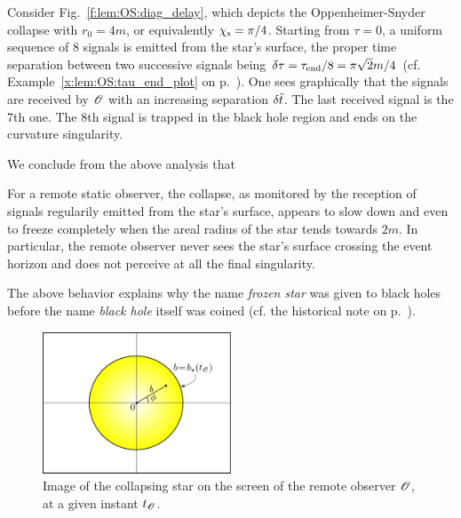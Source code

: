 \begin{example}
Consider Fig.~\ref{f:lem:OS:diag_delay}, which depicts the Oppenheimer-Snyder collapse
with $r_0 = 4 m$, or equivalently $\chi_{\rm s} = \pi/4$. Starting from $\tau=0$, a uniform sequence of 8 signals is emitted from the star's surface, the proper time separation between two successive signals being
$\delta\tau = \tau_{\rm end}/8 = \pi\sqrt{2} m / 4$ (cf. Example~\ref{x:lem:OS:tau_end_plot} on
p.~\pageref{x:lem:OS:tau_end_plot}). One sees graphically that the signals are received by $\mathscr{O}$
with an increasing separation $\delta{\tilde t}$. The last received signal is the 7th one. The 8th signal is trapped in the black hole region and ends on the curvature singularity.
\end{example}

We conclude from the above analysis that
\begin{greybox}
For a remote static observer, the collapse, as monitored by the reception of signals regularily emitted from the star's surface,
appears to slow down and even to freeze completely when the areal radius
of the star tends towards $2 m$. In particular, the remote observer never sees the
star's surface crossing the event horizon and does not perceive at all the final singularity.
\end{greybox}

\begin{hist}
The above behavior explains why the name \emph{frozen star}
was given to black holes before the name \emph{black hole} itself was coined
(cf. the historical note on p.~\pageref{h:glo:black_hole_name}).
\end{hist}


\begin{figure}
\centerline{
\includegraphics[width=0.5\textwidth]{lem_image.pdf}
}
\caption[]{\label{f:lem:image} \footnotesize
Image of the collapsing star on the screen of the remote observer $\mathscr{O}$, at
a given instant $t_{\mathscr{O}}$.
}
\end{figure}


